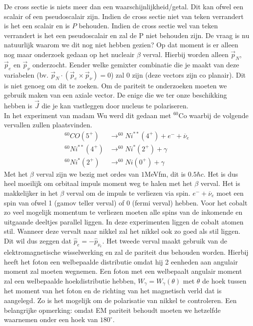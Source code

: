 \documentclass[../main.tex]{subfiles}
\begin{document}
De cross sectie is niets meer dan een waarschijnlijkheid/getal. Dit kan ofwel een scalair of een pseudoscalair zijn. Indien de cross sectie niet van teken verrandert is het een scalair en is $P$ behouden. Indien de cross sectie wel van teken verrandert is het een pseudoscalair en zal de P niet behouden zijn. De vraag is nu natuurlijk waarom we dit nog niet hebben gezien? Op dat moment is er alleen nog maar onderzoek gedaan op het nucleair $\beta$ verval. Hierbij worden alleen $\vec{p}_N$, $\vec{p}_e$ en $\vec{p}_\nu$ onderzocht. Eender welke gemixter combinatie die je maakt van deze variabelen (bv. $\vec{p}_N\cdot(\vec{p}_e\times\vec{p}_\nu)=0$) zal 0 zijn (deze vectors zijn co planair). Dit is niet genoeg om dit te zoeken. Om de pariteit te onderzoeken moeten we gebruik maken van een axiale vector. De enige die we ter onze beschikking hebben is $\vec{J}$ die je kan vastleggen door nucleus te polariseren.\\
In het experiment van madam Wu werd dit gedaan met $^{60}$Co waarbij de volgende vervallen zullen plaatsvinden.
\begin{equation}
    \begin{aligned}
        \label{eq:wu_verval}
        ^{60}CO(5^+) &\rightarrow ^{60}Ni^{**}(4^+) + e^- + \overline \nu_e\\
        ^{60}Ni^{**}(4^+) &\rightarrow ^{60}Ni^*(2^+) + \gamma\\
        ^{60}Ni^*(2^+) &\rightarrow ^{60}Ni(0^+) + \gamma
    \end{aligned}
\end{equation}
Met het $\beta$ verval zijn we bezig met ordes van $1$MeVfm, dit is $0.5\hbar c$. Het is dus heel moeilijk om orbitaal impuls moment weg te halen met het $\beta$ verval. Het is makkelijker in het $\beta$ verval om de impuls te verliezen via spin. $e^- + \overline \nu_e$ moet een spin van ofwel 1 (gamov teller verval) of 0 (fermi verval) hebben. Voor het cobalt zo veel mogelijk momentum te verliezen moeten alle spins van de inkomende en uitgaande deeltjes parallel liggen. In deze experimenten liggen de cobalt atomen stil. Wanneer deze vervalt naar nikkel zal het nikkel ook zo goed als stil liggen. Dit wil dus zeggen dat $\hat{p}_e = -\hat{p}_{\overline \nu_e}$. Het tweede verval maakt gebruik van de elektromagnetische wisselwerking en zal de pariteit dus behouden worden. Hierbij heeft het foton een welbepaalde distributie omdat hij 2 eenheden aan angulair moment zal moeten wegnemen. Een foton met een welbepaalt angulair moment zal een welbepaalde hoekdistributie hebben, $W_\gamma = W_\gamma(\theta)$ met $\theta$ de hoek tussen het moment van het foton en de richting van het magnetisch verld dat is aangelegd. Zo is het mogelijk om de polarisatie van nikkel te controleren. Een belangrijke opmerking: omdat EM pariteit behoudt moeten we hetzelfde waarnemen onder een hoek van $180^\circ$.
\end{document}
